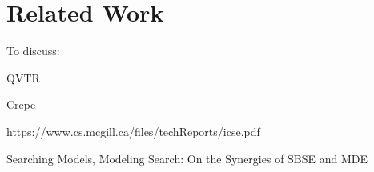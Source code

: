 \section{Related Work}
\label{section:related_work}

	\begin{draftlist}
		To discuss:
		\item QVTR
		\item Crepe
		\item https://www.cs.mcgill.ca/files/techReports/icse.pdf
		\item Searching Models, Modeling Search: On the Synergies of SBSE and MDE %
	\end{draftlist}
